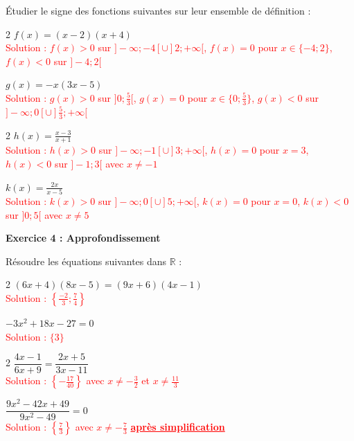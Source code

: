 \documentclass[12pt,a4paper]{exam}
\begin{document}
\vspace{5pt}
Étudier le signe des fonctions suivantes sur leur ensemble de définition :
\vspace{-5pt}
\begin{questions}
\begin{multicols}{2}
    \question $f(x)=(x-2)(x+4)$
    \textcolor{red}{\\Solution : $f(x) > 0$ sur $]-\infty; -4[ \cup ]2; +\infty[$, $f(x) = 0$ pour $x \in \{-4; 2\}$, $f(x) < 0$ sur $]-4; 2[$}

    \question $g(x)=-x(3x-5)$
    \textcolor{red}{\\Solution : $g(x) > 0$ sur $]0; \frac{5}{3}[$, $g(x) = 0$ pour $x \in \{0; \frac{5}{3}\}$, $g(x) < 0$ sur $]-\infty; 0[ \cup ]\frac{5}{3}; +\infty[$}
\end{multicols}
\vspace{5pt}
\begin{multicols}{2}
    \question $\displaystyle h(x)=\frac{x-3}{x+1}$
    \textcolor{red}{\\Solution : $h(x) > 0$ sur $]-\infty; -1[ \cup ]3; +\infty[$, $h(x) = 0$ pour $x = 3$, $h(x) < 0$ sur $]-1; 3[$ avec $x \neq -1$}

    \question $\displaystyle k(x)=\frac{2x}{x-5}$
    \textcolor{red}{\\Solution : $k(x) > 0$ sur $]-\infty; 0[ \cup ]5; +\infty[$, $k(x) = 0$ pour $x = 0$, $k(x) < 0$ sur $]0; 5[$ avec $x \neq 5$}
\end{multicols}
\end{questions}

\vspace{10pt}

\noindent
\textbf{Exercice 4 : Approfondissement}

\vspace{5pt}
Résoudre les équations suivantes dans $\mathbb{R}$ :
\vspace{-5pt}
\begin{questions}
\begin{multicols}{2}
    \question $(6x+4)(8x-5) = (9x+6)(4x-1)$
    \textcolor{red}{\\Solution : $\left\{\frac{-2}{3}; \frac{7}{4}\right\}$}

    \question $-3x^2+18x-27=0$
    \textcolor{red}{\\Solution : $\{3\}$}
\end{multicols}
\vspace{5pt}
\begin{multicols}{2}
    \question $\dfrac{4x-1}{6x+9} = \dfrac{2x+5}{3x-11}$
    \textcolor{red}{\\Solution : $\left\{-\frac{17}{40}\right\}$ avec $x \neq -\frac{3}{2}$ et $x \neq \frac{11}{3}$}

    \question $\dfrac{9x^2-42x+49}{9x^2-49} = 0$
    \textcolor{red}{\\Solution : $\left\{\frac{7}{3}\right\}$ avec $x \neq -\frac{7}{3}$ \underline{\textbf{après simplification}
    }} 
\end{multicols}
\end{questions}
\end{document}
